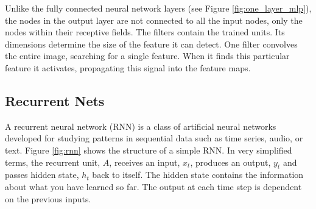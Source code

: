 Unlike the fully connected neural network layers (see Figure \ref{fig:one_layer_mlp}), the nodes in the output layer are not connected to all the input nodes, only the nodes within their receptive fields. The filters contain the trained units. Its dimensions determine the size of the feature it can detect. One filter convolves the entire image, searching for a single feature.  When it finds this particular feature it activates, propagating this signal into the feature maps.

\subsection{Recurrent Nets} \label{sec:reccurent_nets}


A recurrent neural network (RNN) is a class of artificial neural networks developed for studying patterns in sequential data such as time series, audio, or text. Figure \ref{fig:rnn} shows the structure of a simple RNN. In very simplified terms, the recurrent unit, $A$, receives an input, $x_t$, produces an output, $y_t$ and passes hidden state, $h_t$ back to itself. The hidden state contains the information about what you have learned so far. The output at each time step is dependent on the previous inputs. 

